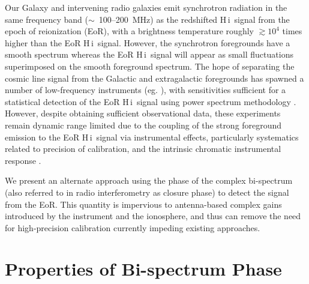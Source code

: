 \documentclass[
reprint,
superscriptaddress,
amsmath,
amssymb,
aps,
prd
]{revtex4-1}
\newcommand{\HI}{H\,{\sc i}}
\begin{document}
Our Galaxy and intervening radio galaxies emit synchrotron radiation in the same frequency band ($\sim$~100--200~MHz) as the redshifted \HI\ signal from the epoch of reionization (EoR), with a brightness temperature roughly $\gtrsim 10^4$ times higher than the EoR \HI\ signal. However, the synchrotron foregrounds have a smooth spectrum whereas the EoR \HI\ signal will appear as small fluctuations superimposed on the smooth foreground spectrum. The hope of separating the cosmic line signal from the Galactic and extragalactic foregrounds has spawned a number of low-frequency instruments (eg. \cite{par10,tin13,van13}), with sensitivities sufficient for a statistical detection of the EoR \HI\ signal using power spectrum methodology \cite{thy13,bea13}.  However, despite obtaining sufficient observational data, these experiments remain dynamic range limited due to the coupling of the strong foreground emission to the EoR \HI\ signal via instrumental effects, particularly systematics related to precision of calibration, and the intrinsic chromatic instrumental response \cite{thy15a,thy15b,thy16,dat09,dat10,tro16, pac13,ali15,patil17,pob15,liu10,zhe14,barry16,sie17,dil17}. 

We present an alternate approach using the phase of the complex bi-spectrum (also referred to in radio interferometry as closure phase) to detect the signal from the EoR. This quantity is impervious to antenna-based complex gains introduced by the instrument and the ionosphere, and thus can remove the need for high-precision calibration currently impeding existing approaches\cite{car16}.

\section{Properties of Bi-spectrum Phase}\label{sec:CPinfo}
\end{document}
